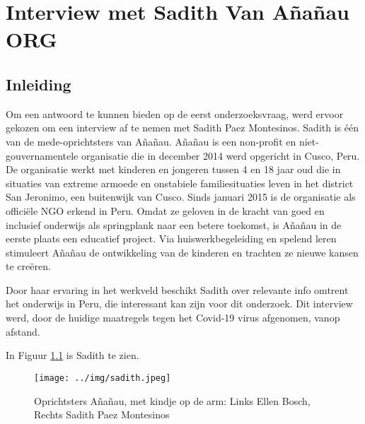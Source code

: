 
\chapter{Interview met Sadith Van Añañau ORG}
\label{ch:interviewSadith}

\section{Inleiding}
Om een antwoord te kunnen bieden op de eerst onderzoeksvraag, werd ervoor gekozen om een interview af te nemen met Sadith Paez Montesinos. Sadith is één van de mede-oprichtsters van Añañau. Añañau is een non-profit en niet-gouvernamentele organisatie die in december 2014 werd opgericht in Cusco, Peru. De organisatie werkt met kinderen en jongeren tussen 4 en 18 jaar oud die in situaties van extreme armoede en onstabiele familiesituaties leven in het district San Jeronimo, een buitenwijk van Cusco. Sinds januari 2015 is de organisatie als officiële NGO erkend in Peru. Omdat ze geloven in de kracht van goed en inclusief onderwijs als springplank naar een betere toekomst, is Añañau in de eerste plaats een educatief project. Via huiswerkbegeleiding en spelend leren stimuleert Añañau de ontwikkeling van de kinderen en trachten ze nieuwe kansen te creëren. \autocite{Ananau2020}

Door haar ervaring in het werkveld beschikt Sadith over relevante info omtrent het onderwijs in Peru, die interessant kan zijn voor dit onderzoek. Dit interview werd, door de huidige maatregels tegen het Covid-19 virus afgenomen, vanop afstand.

In Figuur \ref{sadith} is Sadith te zien.

 \begin{figure}[h!]
	\texttt{[image: ../img/sadith.jpeg]}
	\caption{Oprichtsters Añañau, met kindje op de arm: Links Ellen Bosch, Rechts Sadith Paez Montesinos} \autocite{Ananau2020}
	\label{sadith}
\end{figure}



